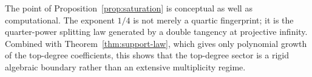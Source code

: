 The point of Proposition~\ref{prop:saturation} is conceptual as well as computational.
The exponent \(1/4\) is not merely a quartic fingerprint; it is the quarter-power splitting law generated by a double tangency at projective infinity.
Combined with Theorem~\ref{thm:support-law}, which gives only polynomial growth of the top-degree coefficients, this shows that the top-degree sector is a rigid algebraic boundary rather than an extensive multiplicity regime.
